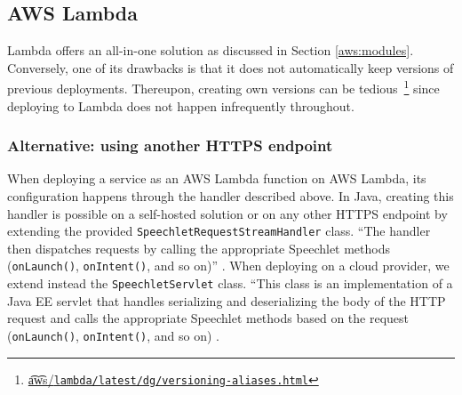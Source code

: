 \subsection*{AWS Lambda}

Lambda offers an all-in-one solution as discussed in Section \ref{aws:modules}. Conversely, one of its drawbacks is that it does not automatically keep versions of previous deployments. 
Thereupon, creating own versions can be tedious~\footnote{\href{https://docs.aws.amazon.com/lambda/latest/dg/versioning-aliases.html}{\t{a\t{ws}}/\lstinline|lambda/latest/dg/versioning-aliases.html|}} since deploying to Lambda does not happen infrequently throughout. %


\subsubsection*{Alternative: using another HTTPS endpoint}

When deploying a service as an AWS Lambda function on AWS Lambda, its configuration happens through the handler described above. In Java, creating this handler is possible on a self-hosted solution or on any other HTTPS endpoint by extending the provided \texttt{SpeechletRequestStreamHandler} class. ``The handler then dispatches requests by calling the appropriate Speechlet methods (\texttt{onLaunch()}, \texttt{onIntent()}, and so on)'' \cite{aws_website}.
When deploying on a cloud provider, we extend instead the \texttt{SpeechletServlet} class. ``This class is an implementation of a Java EE servlet that handles serializing and deserializing the body of the HTTP request and calls the appropriate Speechlet methods based on the request (\texttt{onLaunch()}, \texttt{onIntent()}, and so on) \cite{aws_website}.




